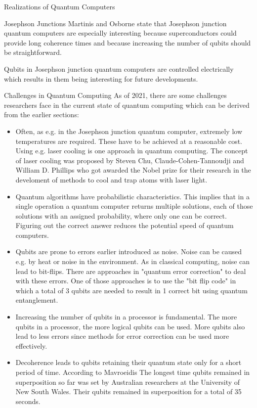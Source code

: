 \documentclass[aps,preprintnumbers,twocolumn]{revtex4}
\begin{document}
\begin{section}{Realizations of Quantum Computers}
\begin{subsection}{Josephson Junctions}
Martinis and Osborne state \cite[p.3]{martinis} that Josephson junction quantum computers are especially interesting because superconductors could provide long coherence times and because increasing the number of qubits should be straightforward. 

Qubits in Josephson junction quantum computers are controlled electrically which results in them being interesting for future developments.
\end{subsection}

\begin{section}{Challenges in Quantum Computing}
As of 2021, there are some challenges researchers face in the current state of quantum computing which can be derived from the earlier sections: 

\begin{itemize}
    \item Often, as e.g. in the Josephson junction quantum computer, extremely low temperatures are required. These have to be achieved at a reasonable cost. Using e.g. laser cooling is one approach in quantum computing. The concept of laser cooling was proposed by Steven Chu, Claude-Cohen-Tannoudji and William D. Phillips who got awarded the Nobel prize for their research in the develoment of methods to cool and trap atoms with laser light.
    \item Quantum algorithms have probabilistic characteristics. 
    This implies that in a single operation a quantum computer returns multiple solutions, each of those solutions with an assigned probability, where only one can be correct. 
    Figuring out the correct answer reduces the potential speed of quantum computers.
    \item Qubits are prone to errors earlier introduced as noise. 
    Noise can be caused e.g. by heat or noise in the environment. 
    As in classical computing, noise can lead to bit-flips. There are approaches in "quantum error correction" to deal with these errors. 
    One of those approaches is to use the "bit flip code" in which a total of 3 qubits are needed to result in 1 correct bit using quantum entanglement.  
    \item Increasing the number of qubits in a processor is fundamental. The more qubits in a processor, the more logical qubits can be used. More qubits also lead to less errors since methods for error correction can be used more effectively.
    \item Decoherence leads to qubits retaining their quantum state only for a short period of time. 
    According to Mavroeidis \cite[p.3]{DBLP:journals/corr/abs-1804-00200} The longest time qubits remained in superposition so far was set by Australian researchers at the University of New South Wales. 
    Their qubits remained in superposition for a total of 35 seconds.
\end{itemize}

\end{section}

\end{section}
\end{document}
